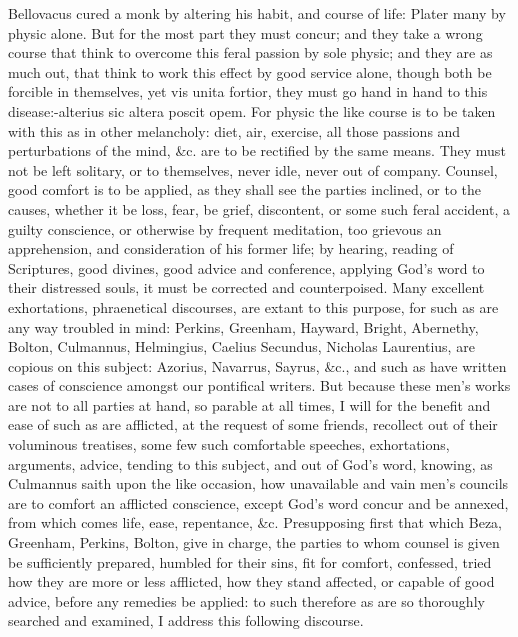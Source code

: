 {Bellovacus cured a monk by altering his habit, and course of
life: Plater many by physic alone. But for the most part they must
concur; and they take a wrong course that think to overcome this feral
passion by sole physic; and they are as much out, that think to work
this effect by good service alone, though both be forcible in
themselves, yet vis unita fortior, they must go hand in hand to this
disease:-alterius sic altera poscit opem. For physic the like course is
to be taken with this as in other melancholy: diet, air, exercise, all
those passions and perturbations of the mind, \&c. are to be rectified
by the same means. They must not be left solitary, or to themselves,
never idle, never out of company. Counsel, good comfort is to be
applied, as they shall see the parties inclined, or to the causes,
whether it be loss, fear, be grief, discontent, or some such feral
accident, a guilty conscience, or otherwise by frequent meditation, too
grievous an apprehension, and consideration of his former life; by
hearing, reading of Scriptures, good divines, good advice and
conference, applying God's word to their distressed souls, it must be
corrected and counterpoised. Many excellent exhortations, phraenetical
discourses, are extant to this purpose, for such as are any way
troubled in mind: Perkins, Greenham, Hayward, Bright, Abernethy,
Bolton, Culmannus, Helmingius, Caelius Secundus, Nicholas Laurentius,
are copious on this subject: Azorius, Navarrus, Sayrus, \&c., and such
as have written cases of conscience amongst our pontifical writers. But
because these men's works are not to all parties at hand, so parable at
all times, I will for the benefit and ease of such as are afflicted, at
the request of some friends, recollect out of their voluminous
treatises, some few such comfortable speeches, exhortations, arguments,
advice, tending to this subject, and out of God's word, knowing, as
Culmannus saith upon the like occasion, how unavailable and vain
men's councils are to comfort an afflicted conscience, except God's
word concur and be annexed, from which comes life, ease, repentance,
\&c. Presupposing first that which Beza, Greenham, Perkins, Bolton, give
in charge, the parties to whom counsel is given be sufficiently
prepared, humbled for their sins, fit for comfort, confessed, tried how
they are more or less afflicted, how they stand affected, or capable of
good advice, before any remedies be applied: to such therefore as are
so thoroughly searched and examined, I address this following
discourse.

}
